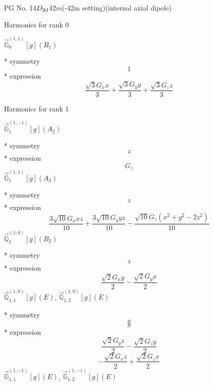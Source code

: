 \documentclass[fleqn,8pt]{jsarticle}
\begin{document}
\setcounter{MaxMatrixCols}{32}

\renewcommand{\tablename}{Table~}
\renewcommand{\figurename}{Figure~}
\begin{center}
\LARGE
PG No. 14\quad$D_{\rm 2d}$\quad$\bar{4}2m$\quad(-42m setting)\quad[ tetragonal ] (internal axial dipole)
\end{center}

\noindent * Harmonics for rank 0

\noindent\quad $\vec{\mathbb{G}}_{0}^{(1,1)}[g](B_{1})$

\noindent\quad ** symmetry
\begin{dmath*}
1
\end{dmath*}
\noindent\quad ** expression
\begin{dmath*}
\frac{\sqrt{3} G_{x} x}{3} + \frac{\sqrt{3} G_{y} y}{3} + \frac{\sqrt{3} G_{z} z}{3}
\end{dmath*}

\noindent * Harmonics for rank 1

\noindent\quad $\vec{\mathbb{G}}_{1}^{(1,-1)}[g](A_{2})$

\noindent\quad ** symmetry
\begin{dmath*}
z
\end{dmath*}
\noindent\quad ** expression
\begin{dmath*}
G_{z}
\end{dmath*}
\noindent\quad $\vec{\mathbb{G}}_{1}^{(1,1)}[g](A_{2})$

\noindent\quad ** symmetry
\begin{dmath*}
z
\end{dmath*}
\noindent\quad ** expression
\begin{dmath*}
\frac{3 \sqrt{10} G_{x} x z}{10} + \frac{3 \sqrt{10} G_{y} y z}{10} - \frac{\sqrt{10} G_{z} \left(x^{2} + y^{2} - 2 z^{2}\right)}{10}
\end{dmath*}
\noindent\quad $\vec{\mathbb{Q}}_{1}^{(1,0)}[g](B_{2})$

\noindent\quad ** symmetry
\begin{dmath*}
z
\end{dmath*}
\noindent\quad ** expression
\begin{dmath*}
\frac{\sqrt{2} G_{x} y}{2} - \frac{\sqrt{2} G_{y} x}{2}
\end{dmath*}
\noindent\quad $\vec{\mathbb{Q}}_{1,1}^{(1,0)}[g](E)$, $\vec{\mathbb{Q}}_{1,2}^{(1,0)}[g](E)$

\noindent\quad ** symmetry
\begin{dmath*}
x
\end{dmath*}
\begin{dmath*}
y
\end{dmath*}
\noindent\quad ** expression
\begin{dmath*}
\frac{\sqrt{2} G_{y} z}{2} - \frac{\sqrt{2} G_{z} y}{2}
\end{dmath*}
\begin{dmath*}
- \frac{\sqrt{2} G_{x} z}{2} + \frac{\sqrt{2} G_{z} x}{2}
\end{dmath*}
\noindent\quad $\vec{\mathbb{G}}_{1,1}^{(1,-1)}[g](E)$, $\vec{\mathbb{G}}_{1,2}^{(1,-1)}[g](E)$
\end{document}
